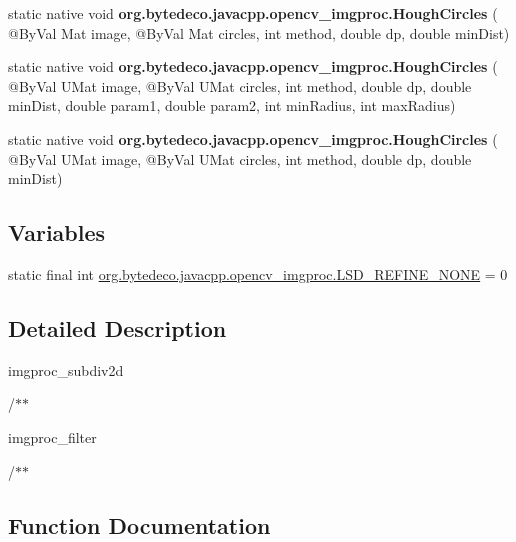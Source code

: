 \begin{DoxyCompactItemize}
static native void {\bfseries org.\+bytedeco.\+javacpp.\+opencv\+\_\+imgproc.\+Hough\+Circles} ( @By\+Val Mat image, @By\+Val Mat circles, int method, double dp, double min\+Dist)
\item 
\mbox{\label{group__imgproc__feature_ga85e35e4b6c0b17ee201ef0f6b8256062}} 
static native void {\bfseries org.\+bytedeco.\+javacpp.\+opencv\+\_\+imgproc.\+Hough\+Circles} ( @By\+Val U\+Mat image, @By\+Val U\+Mat circles, int method, double dp, double min\+Dist, double param1, double param2, int min\+Radius, int max\+Radius)
\item 
\mbox{\label{group__imgproc__feature_ga56ed820c9d4ac68762d0826e1212b3f6}} 
static native void {\bfseries org.\+bytedeco.\+javacpp.\+opencv\+\_\+imgproc.\+Hough\+Circles} ( @By\+Val U\+Mat image, @By\+Val U\+Mat circles, int method, double dp, double min\+Dist)
\end{DoxyCompactItemize}
\subsection*{Variables}
\begin{DoxyCompactItemize}
\item 
static final int \hyperlink{group__imgproc__feature_ga878ecf12ede1cbc57e30e4e700c8385d}{org.\+bytedeco.\+javacpp.\+opencv\+\_\+imgproc.\+L\+S\+D\+\_\+\+R\+E\+F\+I\+N\+E\+\_\+\+N\+O\+NE} = 0
\end{DoxyCompactItemize}


\subsection{Detailed Description}
imgproc\+\_\+subdiv2d 

/$\ast$$\ast$

imgproc\+\_\+filter 

/$\ast$$\ast$ 

\subsection{Function Documentation}
\mbox{\label{group__imgproc__feature_gae85c4c5d2fd8006e4194e3ee73d2277d}} 
